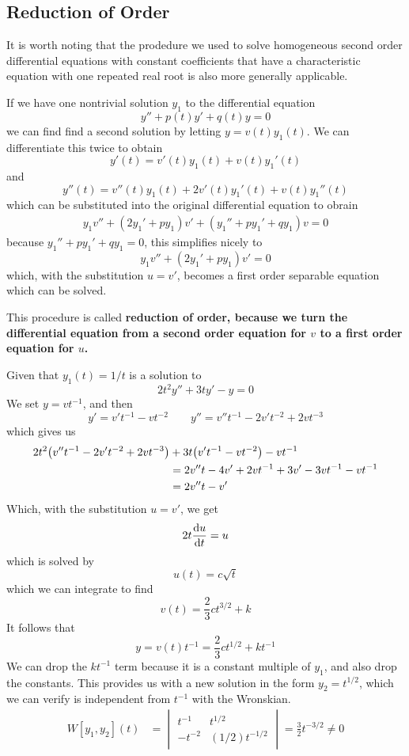 \subsection{Reduction of Order}
It is worth noting that the prodedure we used to solve homogeneous second order differential equations with constant coefficients that have a characteristic equation with one repeated real root is also more generally applicable. \par
If we have one nontrivial solution $y_1$ to the differential equation
\[ y'' + p(t)y' + q(t)y = 0\]
we can find find a second solution by letting $y = v(t)y_1(t)$. We can differentiate this twice to obtain
\[ y'(t) = v'(t)y_1(t) + v(t)y_1'(t)\]
and
\[ y''(t) = v''(t)y_1(t) + 2v'(t)y_1'(t) + v(t)y_1''(t) \]
which can be substituted into the original differential equation to obrain
\begin{align*}
    y_1v'' + (2y_1' + py_1)v' + (y_1'' + py_1' + qy_1)v = 0
\end{align*}
because $y_1'' + py_1' + qy_1 = 0$, this simplifies nicely to
\[ y_1v'' + (2y_1' + py_1)v' = 0\]
which, with the substitution $u = v'$, becomes a first order separable equation which can be solved. \par
This procedure is called \bf{reduction of order}, because we turn the differential equation from a second order equation for $v$ to a first order equation for $u$. 
\begin{example}
    Given that $y_1(t) = 1/t$ is a solution to
    \[ 2t^2 y'' + 3ty' - y = 0 \]
    We set $y = vt^{-1}$, and then
    \[ y' = v't^{-1} - vt^{-2} \quad \quad y'' = v''t^{-1} - 2v't^{-2} + 2vt^{-3} \]
    which gives us
    \begin{align*}
        2t^2 \pqty{v''t^{-1} - 2v't^{-2} + 2vt^{-3}} &+ 3t\pqty{v't^{-1} - vt^{-2}} - vt^{-1} \\
        &= 2v''t - 4v' + 2vt^{-1} + 3v' - 3vt^{-1} - vt^{-1} \\
        &= 2v''t - v'
    \end{align*}
    Which, with the substitution $u=v'$, we get
    \[ 2t\dv{u}{t} = u\]
    which is solved by
    \[ u(t) = c\sqrt{t}\]
    which we can integrate to find
    \[ v(t) = \frac{2}{3}ct^{3/2}+k \]
    It follows that
    \[ y = v(t)t^{-1} = \frac{2}{3}ct^{1/2}+kt^{-1} \]
    We can drop the $kt^{-1}$ term because it is a constant multiple of $y_1$, and also drop the constants. This provides us with a new solution in the form $y_2 = t^{1/2}$, which we can verify is independent from $t^{-1}$ with the Wronskian.
    \begin{align*}
        W[y_1, y_2](t) &= \begin{vmatrix}
            t^{-1} & t^{1/2} \\
            -t^{-2} & (1/2)t^{-1/2}
        \end{vmatrix} = \frac{3}{2}t^{-3/2 } \neq 0
    \end{align*} 
\end{example}
